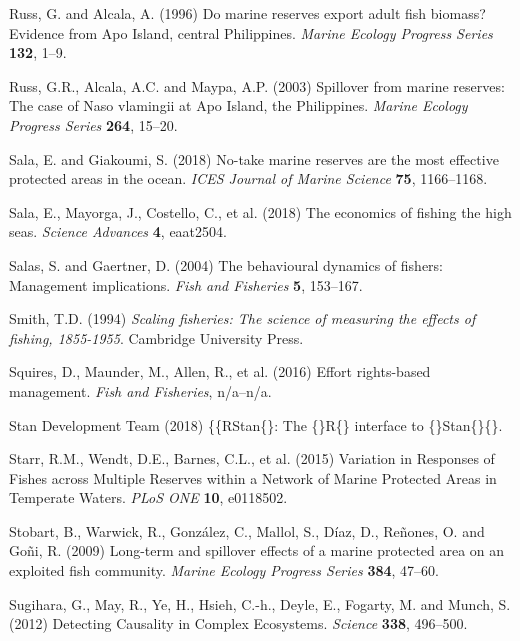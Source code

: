 \documentclass[twoside,12pt,final]{ucthesis-CA2012}
\begin{document}
\begin{ucmainmatter}
\hypertarget{ref-Russ1996}{}
Russ, G. and Alcala, A. (1996) Do marine reserves export adult fish
biomass? Evidence from Apo Island, central Philippines. \emph{Marine
Ecology Progress Series} \textbf{132}, 1--9.

\hypertarget{ref-Russ2003a}{}
Russ, G.R., Alcala, A.C. and Maypa, A.P. (2003) Spillover from marine
reserves: The case of Naso vlamingii at Apo Island, the Philippines.
\emph{Marine Ecology Progress Series} \textbf{264}, 15--20.

\hypertarget{ref-Sala2018b}{}
Sala, E. and Giakoumi, S. (2018) No-take marine reserves are the most
effective protected areas in the ocean. \emph{ICES Journal of Marine
Science} \textbf{75}, 1166--1168.

\hypertarget{ref-Sala2018}{}
Sala, E., Mayorga, J., Costello, C., et al. (2018) The economics of
fishing the high seas. \emph{Science Advances} \textbf{4}, eaat2504.

\hypertarget{ref-Salas2004}{}
Salas, S. and Gaertner, D. (2004) The behavioural dynamics of fishers:
Management implications. \emph{Fish and Fisheries} \textbf{5}, 153--167.

\hypertarget{ref-Smith1994}{}
Smith, T.D. (1994) \emph{Scaling fisheries: The science of measuring the
effects of fishing, 1855-1955}. Cambridge University Press.

\hypertarget{ref-Squires2016}{}
Squires, D., Maunder, M., Allen, R., et al. (2016) Effort rights-based
management. \emph{Fish and Fisheries}, n/a--n/a.

\hypertarget{ref-StanDevelopmentTeam2018}{}
Stan Development Team (2018) \{\{RStan\{\}: The \{\}R\{\} interface to
\{\}Stan\{\}\{\}.

\hypertarget{ref-Starr2015}{}
Starr, R.M., Wendt, D.E., Barnes, C.L., et al. (2015) Variation in
Responses of Fishes across Multiple Reserves within a Network of Marine
Protected Areas in Temperate Waters. \emph{PLoS ONE} \textbf{10},
e0118502.

\hypertarget{ref-Stobart2009}{}
Stobart, B., Warwick, R., González, C., Mallol, S., Díaz, D., Reñones,
O. and Goñi, R. (2009) Long-term and spillover effects of a marine
protected area on an exploited fish community. \emph{Marine Ecology
Progress Series} \textbf{384}, 47--60.

\hypertarget{ref-Sugihara2012}{}
Sugihara, G., May, R., Ye, H., Hsieh, C.-h., Deyle, E., Fogarty, M. and
Munch, S. (2012) Detecting Causality in Complex Ecosystems.
\emph{Science} \textbf{338}, 496--500.


\end{ucmainmatter}
\end{document}
